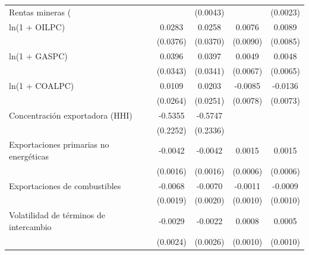 \begin{table}[htbp]
\begin{tabular}{l*{4}{c}}
\addlinespace
Rentas mineras (%
                    &                     &    (0.0043)         &                     &    (0.0023)         \\
\addlinespace
ln(1 + OILPC)       &      0.0283         &      0.0258         &      0.0076         &      0.0089         \\
                    &    (0.0376)         &    (0.0370)         &    (0.0090)         &    (0.0085)         \\
\addlinespace
ln(1 + GASPC)       &      0.0396         &      0.0397         &      0.0049         &      0.0048         \\
                    &    (0.0343)         &    (0.0341)         &    (0.0067)         &    (0.0065)         \\
\addlinespace
ln(1 + COALPC)      &      0.0109         &      0.0203         &     -0.0085         &     -0.0136\sym{*}  \\
                    &    (0.0264)         &    (0.0251)         &    (0.0078)         &    (0.0073)         \\
\addlinespace
Concentración exportadora (HHI)&     -0.5355\sym{**} &     -0.5747\sym{**} &                     &                     \\
                    &    (0.2252)         &    (0.2336)         &                     &                     \\
\addlinespace
Exportaciones primarias no energéticas&     -0.0042\sym{***}&     -0.0042\sym{**} &      0.0015\sym{**} &      0.0015\sym{**} \\
                    &    (0.0016)         &    (0.0016)         &    (0.0006)         &    (0.0006)         \\
\addlinespace
Exportaciones de combustibles&     -0.0068\sym{***}&     -0.0070\sym{***}&     -0.0011         &     -0.0009         \\
                    &    (0.0019)         &    (0.0020)         &    (0.0010)         &    (0.0010)         \\
\addlinespace
Volatilidad de términos de intercambio&     -0.0029         &     -0.0022         &      0.0008         &      0.0005         \\
                    &    (0.0024)         &    (0.0026)         &    (0.0010)         &    (0.0010)         \\

\end{tabular}
\end{table}
